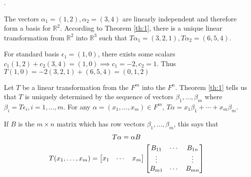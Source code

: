 \documentclass[8pt]{beamer}
\newcommand{\mbb}[1]{\mathbb{#1}}
\begin{document}
\begin{frame}{.}
    \begin{example}
        The vectors $\alpha_1 = (1,2), \alpha_2=(3,4)$ are linearly independent and therefore form a basis for $\mbb{R}^2$. According to Theorem \ref{th:1}, there is a unique linear transformation from $\mbb{R}^2$ into $\mbb{R}^3$ such that $T \alpha_1 = (3,2,1), T \alpha_2 = (6,5,4)$.

        For standard basis $\epsilon_1 = (1,0)$, there exists some scalars $c_1 (1,2) + c_2 (3,4) = (1,0) \implies c_1=-2, c_2=1$.
        Thus $T(1,0) = -2 (3,2,1) + (6,5,4) = (0,1,2)$
    \end{example}

    \begin{example}
        Let $T$ be a linear transformation from the $F^m$ into the $F^n$. Theorem \ref{th:1} tells us that $T$ is uniquely determined by the sequence of vectors $\beta_1, \dots, \beta_m$ where $\beta_i = T \epsilon_i, i=1, \dots, m$. For any $\alpha =(x_1, \dots, x_m)\in F^m$, $T \alpha = x_1 \beta_1 + \cdots + x_m \beta_m$.

        If $B$ is the $m \times n$ matrix which has row vectors $\beta_1, \dots, \beta_m$, this says that 
        \[
            \begin{gathered}
                T \alpha = \alpha B \\
                T (x_1, \dots, x_m) = \left[\begin{matrix} x_1 & \cdots & x_m \end{matrix}\right] \left[\begin{matrix}
                    B_{11} & \cdots & B_{1n} \\
                    \vdots & \empty & \vdots \\
                    B_{m1} & \cdots & B_{mn}
                \end{matrix}\right]
            \end{gathered}
        \]
    \end{example}
\end{frame}
\end{document}
